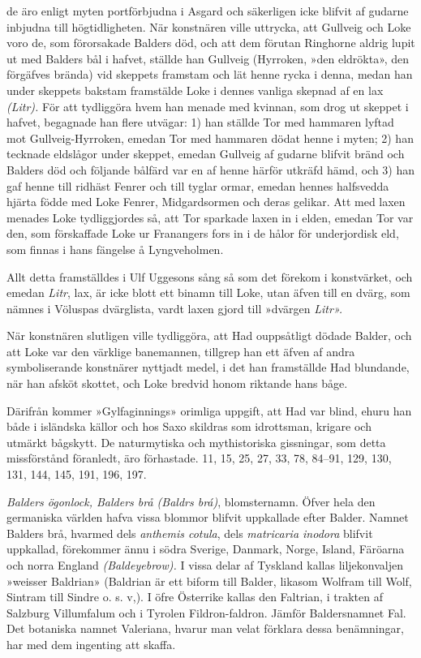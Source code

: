 de äro enligt myten portförbjudna i Asgard och säkerligen icke blifvit
af gudarne inbjudna till högtidligheten. När konstnären ville uttrycka,
att Gullveig och Loke voro de, som förorsakade Balders död, och att dem
förutan Ringhorne aldrig lupit ut med Balders bål i hafvet, ställde han
Gullveig (Hyrroken, »den eldrökta», den förgäfves brända) vid skeppets
framstam och lät henne rycka i denna, medan han under skeppets bakstam
framstälde Loke i dennes vanliga skepnad af en lax \emph{(Litr).} För
att tydliggöra hvem han menade med kvinnan, som drog ut skeppet i
hafvet, begagnade han flere utvägar: 1) han ställde Tor med hammaren
lyftad mot Gullveig-Hyrroken, emedan Tor med hammaren dödat henne i
myten; 2) han tecknade eldslågor under skeppet,
\protect\hypertarget{lb1625905.xhtmlux5cux23start207}{}{}\protect\hypertarget{lb1625905.xhtmlux5cux23start207-a}{}{}\protect\hypertarget{lb1625905.xhtmlux5cux23start207-b}{}{}\protect\hypertarget{lb1625905.xhtmlux5cux23start207-c}{}{}\protect\hypertarget{lb1625905.xhtmlux5cux23start207-d}{}{}
emedan Gullveig af gudarne blifvit bränd och Balders död och följande
bålfärd var en af henne härför utkräfd hämd, och 3) han gaf henne till
ridhäst Fenrer och till tyglar ormar, emedan hennes halfsvedda hjärta
födde med Loke Fenrer, Midgardsormen och deras gelikar. Att med laxen
menades Loke tydliggjordes så, att Tor sparkade laxen in i elden, emedan
Tor var den, som förskaffade Loke ur Franangers fors in i de hålor för
underjordisk eld, som finnas i hans fängelse å Lyngveholmen.

Allt detta framställdes i Ulf Uggesons sång så som det förekom i
konstvärket, och emedan \emph{Litr}, lax, är icke blott ett binamn till
Loke, utan äfven till en dvärg, som nämnes i Völuspas dvärglista, vardt
laxen gjord till »dvärgen \emph{Litr».}

När konstnären slutligen ville tydliggöra, att Had ouppsåtligt dödade
Balder, och att Loke var den värklige banemannen, tillgrep han ett äfven
af andra symboliserande konstnärer nyttjadt medel, i det han framställde
Had blundande, när han afsköt skottet, och Loke bredvid honom riktande
hans båge.

Därifrån kommer »Gylfaginnings» orimliga uppgift, att Had var blind,
ehuru han både i isländska källor och hos Saxo skildras som idrottsman,
krigare och utmärkt bågskytt. De naturmytiska och mythistoriska
gissningar, som detta missförstånd föranledt, äro förhastade. 11, 15,
25, 27, 33, 78, 84--91, 129, 130, 131, 144, 145, 191, 196, 197.

\emph{Balders ögonlock, Balders brå (Baldrs brá)}, blomsternamn. Öfver
hela den germaniska världen hafva vissa blommor blifvit uppkallade efter
Balder. Namnet Balders brå, hvarmed dels \emph{anthemis cotula}, dels
\emph{matricaria inodora} blifvit uppkallad, förekommer ännu i södra
Sverige, Danmark, Norge, Island, Färöarna och norra England
\emph{(Baldeyebrow).} I vissa delar af Tyskland kallas liljekonvaljen
»weisser Baldrian» (Baldrian är ett biform till Balder, likasom Wolfram
till Wolf, Sintram till Sindre o. s. v,). I öfre Österrike kallas den
Faltrian, i trakten af Salzburg Villumfalum och i Tyrolen
Fildron-faldron. Jämför Baldersnamnet Fal. Det botaniska namnet
Valeriana, hvarur man velat förklara dessa benämningar, har med dem
ingenting att skaffa.

